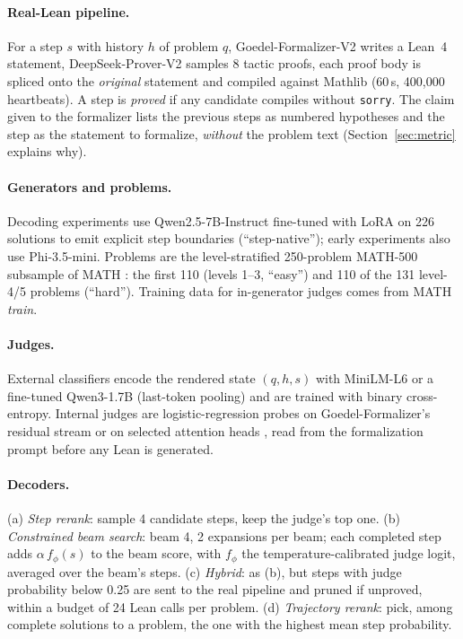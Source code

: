 \documentclass[10pt]{article}
\begin{document}
\paragraph{Real-Lean pipeline.} For a step $s$ with history $h$ of problem $q$, Goedel-Formalizer-V2 writes a Lean~4 statement, DeepSeek-Prover-V2 samples 8 tactic proofs, each proof body is spliced onto the \emph{original} statement and compiled against Mathlib (60\,s, 400{,}000 heartbeats). A step is \emph{proved} if any candidate compiles without \texttt{sorry}. The claim given to the formalizer lists the previous steps as numbered hypotheses and the step as the statement to formalize, \emph{without} the problem text (Section~\ref{sec:metric} explains why).

\paragraph{Generators and problems.} Decoding experiments use Qwen2.5-7B-Instruct \citep{qwen25} fine-tuned with LoRA \citep{hu2022lora} on 226 solutions to emit explicit step boundaries (``step-native''); early experiments also use Phi-3.5-mini. Problems are the level-stratified 250-problem MATH-500 subsample of MATH \citep{hendrycks2021math}: the first 110 (levels 1--3, ``easy'') and 110 of the 131 level-4/5 problems (``hard''). Training data for in-generator judges comes from MATH \emph{train}.

\paragraph{Judges.} External classifiers encode the rendered state $(q,h,s)$ with MiniLM-L6 \citep{wang2020minilm} or a fine-tuned Qwen3-1.7B (last-token pooling) and are trained with binary cross-entropy. Internal judges are logistic-regression probes on Goedel-Formalizer's residual stream or on selected attention heads \citep{li2023iti}, read from the formalization prompt before any Lean is generated.

\paragraph{Decoders.} (a) \emph{Step rerank}: sample 4 candidate steps, keep the judge's top one. (b) \emph{Constrained beam search}: beam 4, 2 expansions per beam; each completed step adds $\alpha\, f_\phi(s)$ to the beam score, with $f_\phi$ the temperature-calibrated judge logit, averaged over the beam's steps. (c) \emph{Hybrid}: as (b), but steps with judge probability below 0.25 are sent to the real pipeline and pruned if unproved, within a budget of 24 Lean calls per problem. (d) \emph{Trajectory rerank}: pick, among complete solutions to a problem, the one with the highest mean step probability.
\end{document}
